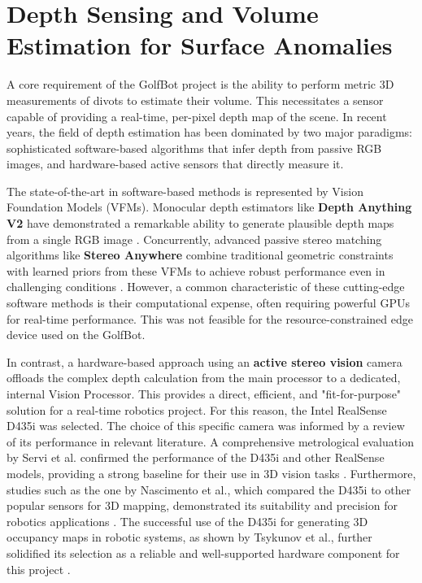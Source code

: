 \section{Depth Sensing and Volume Estimation for Surface Anomalies}
\label{sec:lit_depth_volume}

A core requirement of the GolfBot project is the ability to perform metric 3D measurements of divots to estimate their volume. This necessitates a sensor capable of providing a real-time, per-pixel depth map of the scene. In recent years, the field of depth estimation has been dominated by two major paradigms: sophisticated software-based algorithms that infer depth from passive RGB images, and hardware-based active sensors that directly measure it.

The state-of-the-art in software-based methods is represented by Vision Foundation Models (VFMs). Monocular depth estimators like \textbf{Depth Anything V2} have demonstrated a remarkable ability to generate plausible depth maps from a single RGB image \cite{yang2024depthanythingv2}. Concurrently, advanced passive stereo matching algorithms like \textbf{Stereo Anywhere} combine traditional geometric constraints with learned priors from these VFMs to achieve robust performance even in challenging conditions \cite{bartolomei2024stereoanywhere}. However, a common characteristic of these cutting-edge software methods is their computational expense, often requiring powerful GPUs for real-time performance. This was not feasible for the resource-constrained edge device used on the GolfBot.

In contrast, a hardware-based approach using an \textbf{active stereo vision} camera offloads the complex depth calculation from the main processor to a dedicated, internal Vision Processor. This provides a direct, efficient, and "fit-for-purpose" solution for a real-time robotics project. For this reason, the Intel RealSense D435i was selected. The choice of this specific camera was informed by a review of its performance in relevant literature. A comprehensive metrological evaluation by Servi et al. confirmed the performance of the D435i and other RealSense models, providing a strong baseline for their use in 3D vision tasks \cite{servi2024comparative}. Furthermore, studies such as the one by Nascimento et al., which compared the D435i to other popular sensors for 3D mapping, demonstrated its suitability and precision for robotics applications \cite{nascimento2023kinect}. The successful use of the D435i for generating 3D occupancy maps in robotic systems, as shown by Tsykunov et al., further solidified its selection as a reliable and well-supported hardware component for this project \cite{tsykunov2020coupling}.

